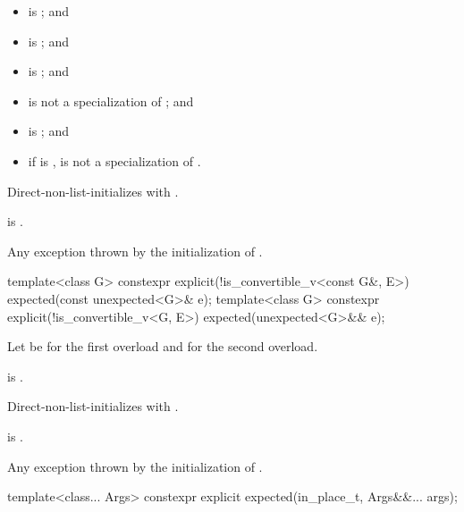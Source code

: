 \begin{itemdescr}
\pnum
\constraints
\begin{itemize}
\item
{} is ; and
\item
{} is ; and
\item
{} is ; and
\item
{} is not a specialization of ; and
\item
{} is ; and
\item
if  is \cv{} ,
 is not a specialization of .
\end{itemize}

\pnum
\effects
Direct-non-list-initializes  with .

\pnum
\ensures
{} is .

\pnum
\throws
Any exception thrown by the initialization of .
\end{itemdescr}

%
\begin{itemdecl}
template<class G>
  constexpr explicit(!is_convertible_v<const G&, E>) expected(const unexpected<G>& e);
template<class G>
  constexpr explicit(!is_convertible_v<G, E>) expected(unexpected<G>&& e);
\end{itemdecl}

\begin{itemdescr}
\pnum
Let  be  for the first overload and
 for the second overload.

\pnum
\constraints
{} is .

\pnum
\effects
Direct-non-list-initializes  with .

\pnum
\ensures
{} is .

\pnum
\throws
Any exception thrown by the initialization of .
\end{itemdescr}

%
\begin{itemdecl}
template<class... Args>
  constexpr explicit expected(in_place_t, Args&&... args);
\end{itemdecl}

